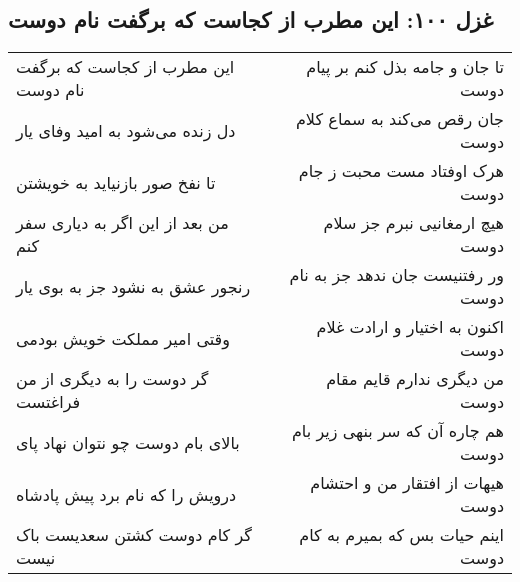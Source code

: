 \begin{center}
\section*{غزل ۱۰۰: این مطرب از کجاست که برگفت نام دوست}
\label{sec:100}
\begin{longtable}{l p{0.5cm} r}
این مطرب از کجاست که برگفت نام دوست
&&
تا جان و جامه بذل کنم بر پیام دوست
\\
دل زنده می‌شود به امید وفای یار
&&
جان رقص می‌کند به سماع کلام دوست
\\
تا نفخ صور بازنیاید به خویشتن
&&
هرک اوفتاد مست محبت ز جام دوست
\\
من بعد از این اگر به دیاری سفر کنم
&&
هیچ ارمغانیی نبرم جز سلام دوست
\\
رنجور عشق به نشود جز به بوی یار
&&
ور رفتنیست جان ندهد جز به نام دوست
\\
وقتی امیر مملکت خویش بودمی
&&
اکنون به اختیار و ارادت غلام دوست
\\
گر دوست را به دیگری از من فراغتست
&&
من دیگری ندارم قایم مقام دوست
\\
بالای بام دوست چو نتوان نهاد پای
&&
هم چاره آن که سر بنهی زیر بام دوست
\\
درویش را که نام برد پیش پادشاه
&&
هیهات از افتقار من و احتشام دوست
\\
گر کام دوست کشتن سعدیست باک نیست
&&
اینم حیات بس که بمیرم به کام دوست
\\
\end{longtable}
\end{center}
